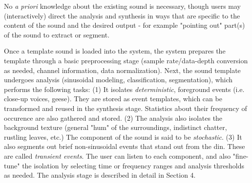 \documentclass{acmsiggraph}               %
\begin{document}
No \textit{a priori} knowledge about the existing sound is necessary, 
though users may (interactively) direct the analysis and synthesis in 
ways that are specific to the content of the sound and the desired output - 
for example "pointing out" part(s) of the sound to extract or segment.


Once a template sound is loaded into the system, the system prepares the template 
through a basic preprocessing stage (sample rate/data-depth conversion as needed, channel information, data normalization).
Next, the sound template undergoes analysis (sinusoidal modeling, 
classification, segmentation), which performs the following tasks:
(1) It isolates \textit{deterministic}, foreground events (i.e. close-up voices, geese).  They are 
stored as event templates, which can be transformed and
reused in the synthesis stage.  Statistics about their frequency 
of occurence are also gathered and stored.
(2) The analysis also isolates the background texture (general "hum" of the surroundings,
indistinct chatter, rustling leaves, etc.)  The component of the sound is said to be 
\textit{stochastic}.
(3) It also segments out brief non-sinusoidal events that stand out from the din. These are called \textit{transient events}.  The user can listen to each component, and also 
"fine-tune" the isolation by selecting time or frequency ranges and analysis thresholds as needed.  The analysis stage is described in detail in Section 4.

\end{document}
